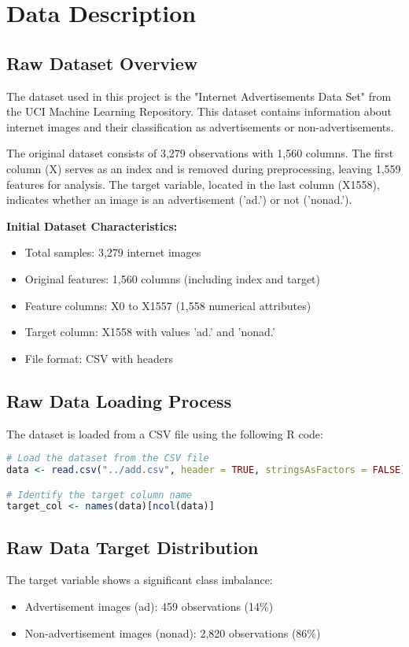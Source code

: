 \section{Data Description}
\label{sec:data_description}

\subsection{Raw Dataset Overview}
The dataset used in this project is the "Internet Advertisements Data Set" from the UCI Machine Learning Repository. This dataset contains information about internet images and their classification as advertisements or non-advertisements.

The original dataset consists of 3,279 observations with 1,560 columns. The first column (X) serves as an index and is removed during preprocessing, leaving 1,559 features for analysis. The target variable, located in the last column (X1558), indicates whether an image is an advertisement ('ad.') or not ('nonad.').

\textbf{Initial Dataset Characteristics:}
\begin{itemize}
    \item Total samples: 3,279 internet images
    \item Original features: 1,560 columns (including index and target)
    \item Feature columns: X0 to X1557 (1,558 numerical attributes)
    \item Target column: X1558 with values 'ad.' and 'nonad.'
    \item File format: CSV with headers
\end{itemize}

\subsection{Raw Data Loading Process}
The dataset is loaded from a CSV file using the following R code:

\begin{lstlisting}[language=R]
# Load the dataset from the CSV file
data <- read.csv("../add.csv", header = TRUE, stringsAsFactors = FALSE)

# Identify the target column name
target_col <- names(data)[ncol(data)]
\end{lstlisting}

\subsection{Raw Data Target Distribution}
The target variable shows a significant class imbalance:
\begin{itemize}
    \item Advertisement images (ad): 459 observations (14\%)
    \item Non-advertisement images (nonad): 2,820 observations (86\%)
\end{itemize}

